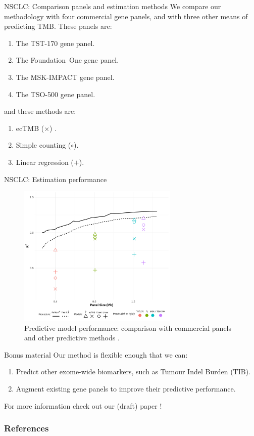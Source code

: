 \documentclass{beamer}
\begin{document}
\begin{frame}{NSCLC: Comparison panels and estimation methods}
We compare our methodology with four commercial gene panels, and with three other means of predicting TMB. These panels are:
\begin{enumerate}
\item The \color{red} TST-170 \color{black} gene panel.
\item The \color{green} Foundation~One \color{black} gene panel.
\item The \color{blue} MSK-IMPACT \color{black} gene panel.
\item The \color{purple} TSO-500 \color{black} gene panel.
\end{enumerate}
and these methods are:
\begin{enumerate}
    \item ecTMB  ($\times$) \citep{yao_ectmb_2020}.
    \item Simple counting ($\circ$).
    \item Linear regression ($+$).
\end{enumerate}

\end{frame}




\begin{frame}{NSCLC: Estimation performance}

\begin{figure}[htbp]
\centering
\includegraphics[width=3in]{fig7_alt.png}
\caption{Predictive model performance: comparison with commercial panels and other predictive methods \citep{bradley_data-driven_2021, yao_ectmb_2020}. \label{fig:7}}
\end{figure}
\end{frame}

\begin{frame}{Bonus material}
Our method is flexible enough that we can:
\begin{enumerate}
    \item Predict other exome-wide biomarkers, such as Tumour Indel Burden (TIB).
    \item Augment existing gene panels to improve their predictive performance.
\end{enumerate}
For more information check out our (draft) paper \cite{bradley_data-driven_2021}!
\end{frame}

\appendix
\begin{frame}[allowframebreaks]
        \frametitle{References}
        
\end{frame}
\end{document}
